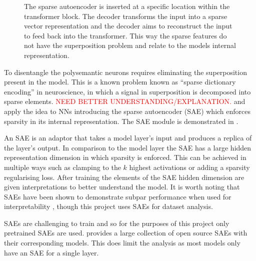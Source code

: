 \begin{figure}
    \centering
    \captionsetup{width=.9\textwidth}
    
    \caption{The sparse autoencoder is inserted at a specific location within the transformer block. The decoder transforms the input into a sparse vector representation and the decoder aims to reconstruct the input to feed back into the transformer. This way the sparse features do not have the superposition problem and relate to the models internal representation.}
    \label{fig:sae}
\end{figure}

To disentangle the polysemantic neurons requires eliminating the superposition present in the model.
This is a known problem known as ``sparse dictionary encoding'' \cite{sparse-coding} in neuroscience, in which a signal in superposition is decomposed into sparse elements. \textcolor{red}{NEED BETTER UNDERSTANDING/EXPLANATION.}
\citet{sae-orig} and \citet{saes} apply the idea to NNs introducing the sparse autoencoder (SAE) which enforces sparsity in its internal representation.
The SAE module is demonstrated in .

An SAE is an adaptor that takes a model layer's input and produces a replica of the layer's output.
In comparison to the model layer the SAE has a large hidden representation dimension in which sparsity is enforced.
This can be achieved in multiple ways such as clamping to the $k$ highest activations \cite{k-sparsity} or adding a sparsity regularising loss.
After training the elements of the SAE hidden dimension are given interpretations to better understand the model.
It is worth noting that SAEs have been shown to demonstrate subpar performance when used for interpretability \cite{saes-bad}, though this project uses SAEs for dataset analysis.

SAEs are challenging to train and so for the purposes of this project only pretrained SAEs are used.
\citet{saelens} provides a large collection of open source SAEs with their corresponding models.
This does limit the analysis as most models only have an SAE for a single layer.
